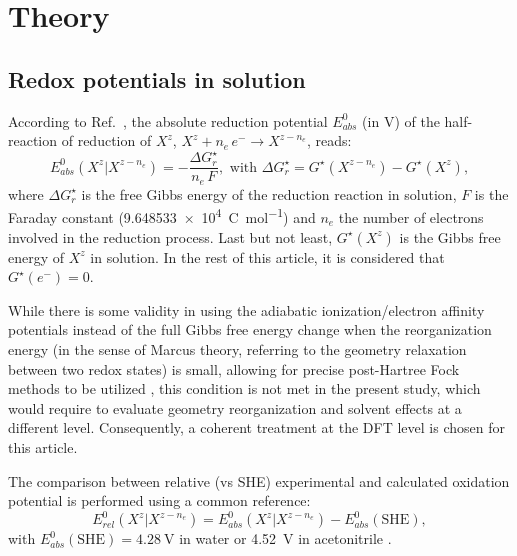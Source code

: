 \documentclass[review,preprint]{elsarticle}
\begin{document}
\section{Theory}\label{sec:theory}

\subsection{Redox potentials in solution}

According to Ref.~\cite{marenichComputationalElectrochemistryPrediction2014}, the absolute reduction potential $E_{abs}^0$ (in \si{\volt}) of the half-reaction of reduction of $X^z$, $X^{z} + n_e\,e^- \rightarrow X^{z-n_e}$, reads: \begin{equation}
	E_{abs}^0(X^{z}|X^{z-n_e}) = -\frac{\Delta G_{r}^\star}{n_e\,F}, \text{ with } \Delta G_{r}^\star = G^\star(X^{z-n_e}) - G^\star(X^z), \label{eq:nernst}
\end{equation}
where $\Delta G_{r}^\star$ is the free Gibbs energy of the reduction reaction in solution, $F$ is the Faraday constant (\SI{9.648533e4}{\coulomb\per\mole}) and $n_e$ the number of electrons involved in the reduction process. Last but not least, $G^\star(X^z)$ is the Gibbs free energy of $X^z$ in solution.  In the rest of this article, it is considered that $G^\star(e^-) = 0$.

While there is some validity in using the adiabatic ionization/electron affinity potentials instead of the full Gibbs free energy change when the reorganization energy (in the sense of Marcus theory, referring to the geometry relaxation between two redox states) is small, allowing for precise post-Hartree Fock methods to be utilized \cite{namazianBenchmarkCalculationsAbsolute2010,marenichComputationalElectrochemistryPrediction2014,makosModelingAbsoluteRedox2022}, this condition is not met in the present study, which would require to evaluate geometry reorganization and solvent effects at a different level. Consequently, a coherent treatment at the DFT level is chosen for this article.


The comparison between relative (vs SHE) experimental and calculated oxidation potential is performed using a common reference:\begin{equation}
	E^0_{rel}(X^z|X^{z-n_e})  = E^0_{abs}(X^z|X^{z-n_e}) - E^{0}_{abs}(\text{SHE}), \label{eq:ecalc}
\end{equation}
with $E^0_{abs}(\text{SHE}) = \SI{4.28}{\volt}$ in water or \SI{4.52}{\volt} in acetonitrile \cite{marenichComputationalElectrochemistryPrediction2014}.
\end{document}
